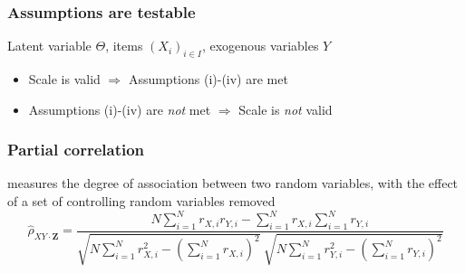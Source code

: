 \documentclass{beamer}
\begin{document}
\begin{frame}\frametitle{Assumptions are testable }
Latent variable $\Theta$, items $(X_i)_{i\in I}$, exogenous variables $Y$
\begin{itemize}
\item Scale is valid $\Rightarrow$ Assumptions (i)-(iv) are met
\item Assumptions (i)-(iv) are \textit{not} met $\Rightarrow$ Scale is \textit{not} valid
\end{itemize}
\end{frame}

\begin{frame}\frametitle{Partial correlation}
measures the degree of association between two random variables, with the effect of a set of controlling random variables removed
$$
\hat{\rho}_{XY\cdot\mathbf{Z}}=\frac{N\sum_{i=1}^N r_{X,i}r_{Y,i}-\sum_{i=1}^N r_{X,i}\sum_{i=1}^N r_{Y,i}}
{\sqrt{N\sum_{i=1}^N r_{X,i}^2-\left(\sum_{i=1}^N r_{X,i}\right)^2}~\sqrt{N\sum_{i=1}^N r_{Y,i}^2-\left(\sum_{i=1}^N r_{Y,i}\right)^2}}
$$
\end{frame}
\end{document}
